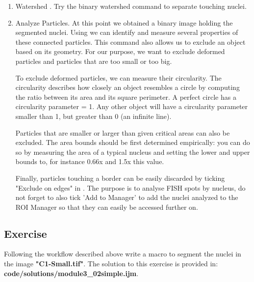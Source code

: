\begin{enumerate}
    

    \item Watershed
    .
    Try the binary watershed command to separate touching nuclei.%
   

    \item Analyze Particles.
    At this point we obtained a binary image holding the segmented nuclei.
    Using  we can identify and measure several properties of these connected particles. This command also allows us to exclude an object based on its geometry. For our purpose,  we want to exclude deformed particles and particles that are too small or too big.
    
    To exclude deformed particles, we can measure their circularity. The circularity describes how closely an object resembles a circle by computing the ratio between its area and its square perimeter. A perfect circle has a circularity parameter = 1. Any other object will have a circularity parameter smaller than 1, but greater than 0 (an infinite line). 
    
    Particles that are smaller or larger than given critical areas can also be excluded. The area bounds should be first determined empirically: you can do so by measuring the area of a typical nucleus and setting the lower and upper bounds to, for instance 0.66x and 1.5x this value. 
    
    Finally, particles touching a border can be easily discarded by ticking "Exclude on edges" in . The purpose is to analyse FISH spots by nucleus, do not forget to also tick 'Add to Manager' to add the nuclei analyzed to the ROI Manager so that they can easily be accessed further on.
    

\end{enumerate}

\subsection{Exercise }
Following the workflow described above write a macro to segment the nuclei in the image \textbf{"C1-Small.tif"}. The solution to this exercise is provided in: \textbf{code/solutions/module3\_02simple.ijm}.

